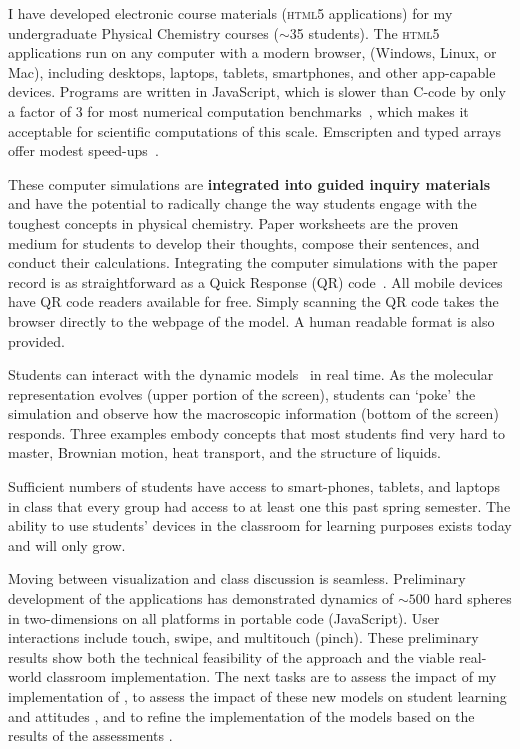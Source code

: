 \documentclass[10pt,letterpaper]{article}
\begin{document}

I have developed electronic course materials (\textsc{html5} applications) for my undergraduate Physical Chemistry courses ($\sim$35 students). The \textsc{html5} applications run on any computer with a modern browser, (Windows, Linux, or Mac), including desktops, laptops, tablets, smartphones, and other app-capable devices. Programs are written in JavaScript, which is slower than C-code by only a factor of 3 for most numerical computation benchmarks~\cite{Khan2014}, which makes it acceptable for scientific computations of this scale. Emscripten and typed arrays offer modest speed-ups~\cite{Khan2014}. 

These computer simulations are \textbf{integrated into guided inquiry materials} and have the potential to radically change the way students engage with the toughest concepts in physical chemistry. Paper worksheets are the proven medium for students to develop their thoughts, compose their sentences, and conduct their calculations. Integrating the computer simulations with the paper record is as straightforward as a Quick Response (QR) code~. All mobile devices have QR code readers available for free. Simply scanning the QR code takes the browser directly to the webpage of the model. A human readable format is also provided.

Students can interact with the dynamic models~ in real time. As the molecular representation evolves (upper portion of the screen), students can `poke' the simulation and observe how the macroscopic information (bottom of the screen) responds. Three examples  embody concepts that most students find very hard to master, Brownian motion, heat transport, and the structure of liquids.

Sufficient numbers of students have access to smart-phones, tablets, and laptops in class that every \pogil group had access to at least one this past spring semester. The ability to use students' devices in the classroom for learning purposes exists today and will only grow. 

Moving between visualization and class discussion is seamless. Preliminary development of the applications has demonstrated dynamics of $\sim500$ hard spheres in two-dimensions on all platforms in portable code (JavaScript). User interactions include touch, swipe, and multitouch (pinch). These preliminary results show both the technical feasibility of the approach and the viable real-world classroom implementation. The next  tasks are to assess the impact of my implementation of \pogil {}, to assess the impact of these new models on student learning and attitudes , and to refine the implementation of the models based on the results of the assessments .
\end{document}
